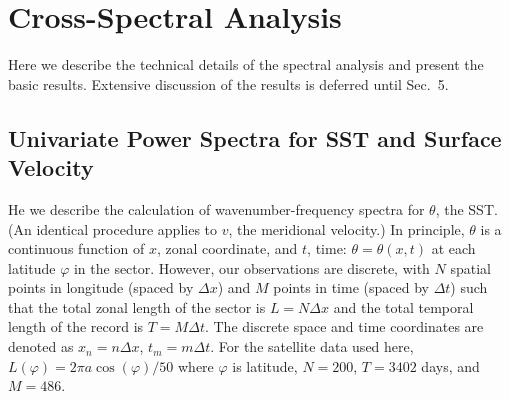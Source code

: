\documentclass[10pt]{article}
\begin{document}

\section{Cross-Spectral Analysis}

Here we describe the technical details of the spectral analysis and present the basic results. Extensive discussion of the results is deferred until Sec.~5.

\subsection{Univariate Power Spectra for SST and Surface Velocity}

He we describe the calculation of wavenumber-frequency spectra for $\theta$, the SST. (An identical procedure applies to $v$, the meridional velocity.) In principle, $\theta$ is a continuous function of $x$, zonal coordinate, and $t$, time: $\theta = \theta(x,t)$ at each latitude $\varphi$ in the sector. However, our observations are discrete, with $N$ spatial points in longitude (spaced by $\Delta x$) and $M$ points in time (spaced by $\Delta t$) such that the total zonal length of the sector is $L = N \Delta x$ and the total temporal length of the record is $T = M \Delta t$. The discrete space and time coordinates are denoted as $x_n = n \Delta x$, $t_m = m \Delta t$. For the satellite data used here, $L(\varphi) = 2 \pi a \cos(\varphi) / 50$ where $\varphi$ is latitude, $N = 200$, $T = 3402$ days, and $M = 486$.
\end{document}
